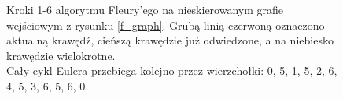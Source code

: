 \documentclass[a4paper, 12pt, twoside, openright]{article}
\begin{document}
\begin{figure}[p]
		\caption[]{Kroki 1-6 algorytmu Fleury'ego na nieskierowanym grafie wejściowym z rysunku \ref{f_graph}. Grubą linią czerwoną oznaczono aktualną krawędź, cieńszą krawędzie już odwiedzone, a na niebiesko krawędzie wielokrotne. \\Cały cykl Eulera przebiega kolejno przez wierzchołki: 0, 5, 1, 5, 2, 6, 4, 5, 3, 6, 5, 6, 0.}
		\label{imgFluAlgoEgz1}
	\end{figure}	
	
	\begin{figure}[p]
		\centering
		\quad
		\quad
		\quad

\end{figure}
\end{document}
